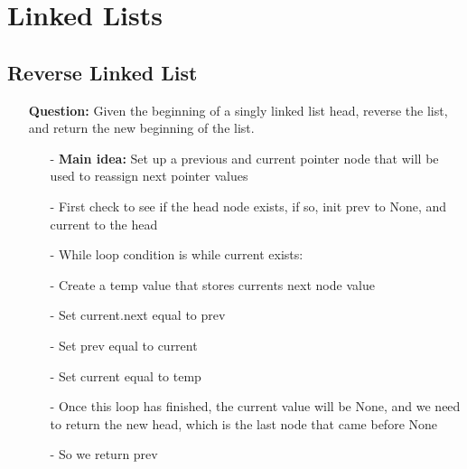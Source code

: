 \documentclass[12pt]{article}
\begin{document}
\section{Linked Lists}

\subsection{Reverse Linked List}
\begin{enumerate}
  \item[] \textbf{Question:} Given the beginning of a singly linked list head, reverse the list, and return the new beginning of the list.

    \begin{enumerate}
      \item[-] \textbf{Main idea:} Set up a previous and current pointer node that will be used to reassign next pointer values
      \item[-] First check to see if the head node exists, if so, init prev to None, and current to the head 
      \item[-] While loop condition is while current exists: 
      \item[-] Create a temp value that stores currents next node value
      \item[-] Set current.next equal to prev 
      \item[-] Set prev equal to current 
      \item[-] Set current equal to temp
      \item[-] Once this loop has finished, the current value will be None, and we need to return the new head, which is the last node that came before None
      \item[-] So we return prev


    \end{enumerate}
\end{enumerate}
\end{document}
